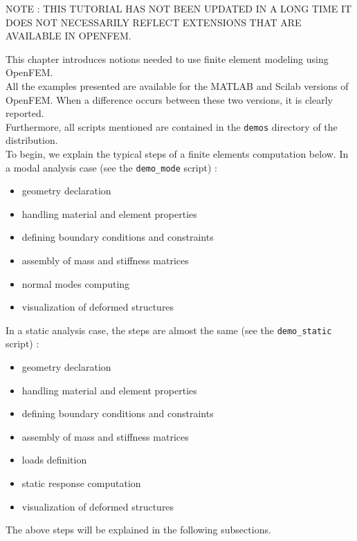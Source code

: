 

NOTE : THIS TUTORIAL HAS NOT BEEN UPDATED IN A LONG TIME IT DOES NOT NECESSARILY REFLECT EXTENSIONS THAT ARE AVAILABLE IN OPENFEM.

This chapter introduces notions needed to use finite element modeling using OpenFEM. \\
All the examples presented are available for the MATLAB and Scilab versions of OpenFEM. When a difference occurs between these two versions, it is clearly reported.\\
Furthermore, all scripts mentioned are contained in the {\tt demos} directory of the distribution.\\

To begin, we explain the typical steps of a finite elements computation below.
In a modal analysis case (see the {\tt demo\_mode} script) :
\begin{itemize}
\item geometry declaration
\item handling material and element properties
\item defining boundary conditions and constraints
\item assembly of mass and stiffness matrices
\item normal modes computing
\item visualization of deformed structures
\end{itemize}

In a static analysis case, the steps are almost the same (see the {\tt demo\_static} script) :
\begin{itemize}
\item geometry declaration
\item handling material and element properties
\item defining boundary conditions and constraints
\item assembly of mass and stiffness matrices
\item loads definition
\item static response computation
\item visualization of deformed structures
\end{itemize}
The above steps will be explained in the following subsections.

